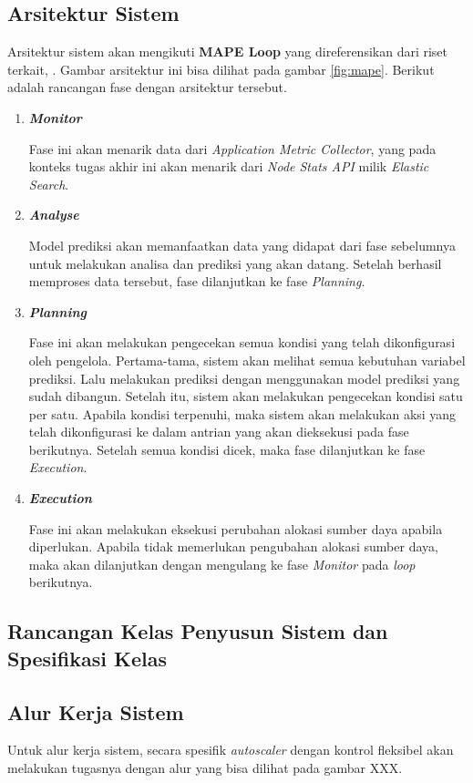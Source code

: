 \subsection{Arsitektur Sistem}

Arsitektur sistem akan mengikuti \textbf{MAPE Loop} yang direferensikan dari riset terkait, \parencite{riset1}. Gambar arsitektur ini bisa dilihat pada gambar \ref{fig:mape}. Berikut adalah rancangan fase dengan arsitektur tersebut.

\begin{enumerate}
    \item \bfseries \textit{Monitor} \normalfont
    
        Fase ini akan menarik data dari \textit{Application Metric Collector}, yang pada konteks tugas akhir ini akan menarik dari \textit{Node Stats API} milik \textit{Elastic Search}.
    \item \bfseries \textit{Analyse} \normalfont
    
        Model prediksi akan memanfaatkan data yang didapat dari fase sebelumnya untuk melakukan analisa dan prediksi yang akan datang. Setelah berhasil memproses data tersebut, fase dilanjutkan ke fase \textit{Planning}.
    \item \bfseries \textit{Planning} \normalfont
    
        Fase ini akan melakukan pengecekan semua kondisi yang telah dikonfigurasi oleh pengelola. Pertama-tama, sistem akan melihat semua kebutuhan variabel prediksi. Lalu melakukan prediksi dengan menggunakan model prediksi yang sudah dibangun. Setelah itu, sistem akan melakukan pengecekan kondisi satu per satu. Apabila kondisi terpenuhi, maka sistem akan melakukan aksi yang telah dikonfigurasi ke dalam antrian yang akan dieksekusi pada fase berikutnya. Setelah semua kondisi dicek, maka fase dilanjutkan ke fase \textit{Execution}.
    \item \bfseries \textit{Execution} \normalfont
    
        Fase ini akan melakukan eksekusi perubahan alokasi sumber daya apabila diperlukan. Apabila tidak memerlukan pengubahan alokasi sumber daya, maka akan dilanjutkan dengan mengulang ke fase \textit{Monitor} pada \textit{loop} berikutnya.
\end{enumerate}

\subsection{Rancangan Kelas Penyusun Sistem dan Spesifikasi Kelas}







\subsection{Alur Kerja Sistem}

Untuk alur kerja sistem, secara spesifik \textit{autoscaler} dengan kontrol fleksibel akan melakukan tugasnya dengan alur yang bisa dilihat pada gambar XXX.